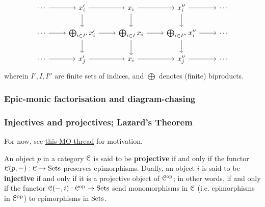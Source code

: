 \begin{example}
$$                            \begin{tikzcd}
                            	\cdots & {x'_i} & {x_i} & {x''_i} & \cdots \\
                            	{\cdots} & {\bigoplus_{i \in I'} x_i'} & {\bigoplus_{i \in I} x_i} & {\bigoplus_{i \in I''} x_i''} & {\cdots} \\
                            	\cdots & {x_j'} & {x_i} & {x_j''} & \cdots
                            	\arrow[from=2-1, to=2-2]
                            	\arrow[from=2-2, to=2-3]
                            	\arrow[from=2-3, to=2-4]
                            	\arrow[from=2-4, to=2-5]
                            	\arrow[from=1-2, to=2-2]
                            	\arrow[from=2-2, to=3-2]
                            	\arrow[from=1-3, to=2-3]
                            	\arrow[from=2-3, to=3-3]
                            	\arrow[from=1-4, to=2-4]
                            	\arrow[from=2-4, to=3-4]
                            	\arrow[from=1-2, to=1-3]
                            	\arrow[from=1-3, to=1-4]
                            	\arrow[from=3-2, to=3-3]
                            	\arrow[from=3-3, to=3-4]
                            	\arrow[from=1-1, to=1-2]
                            	\arrow[from=1-4, to=1-5]
                            	\arrow[from=3-1, to=3-2]
                            	\arrow[from=3-4, to=3-5]
                            \end{tikzcd}
                        $$
                    wherein $I', I, I''$ are finite sets of indices, and $\bigoplus$ denotes (finite) biproducts.
                \end{example}
        
        \subsubsection{Epic-monic factorisation and diagram-chasing}
        
        \subsubsection{Injectives and projectives; Lazard's Theorem}
            For now, see \href{https://mathoverflow.net/questions/46541/how-to-introduce-notions-of-flat-projective-and-free-modules}{\underline{this MO thread}} for motivation.
        
            \begin{definition} \label{def: projective_and_injective_objects}  
                An object $p$ in a category $\mathcal{C}$ is said to be \textbf{projective} if and only if the functor $\mathcal{C}(p, -): \mathcal{C} \to \mathrm{Sets}$ preserves epimorphisms. Dually, an object $i$ is said to be \textbf{injective} if and only if it is a projective object of $\mathcal{C}^{\mathrm{op}}$; in other words, if and only if the functor $\mathcal{C}(-, i): \mathcal{C}^{\mathrm{op}} \to \mathrm{Sets}$ send monomorphisms in $\mathcal{C}$ (i.e. epimorphisms in $\mathcal{C}^{\mathrm{op}}$) to epimorphisms in $\mathrm{Sets}$.
            \end{definition}
            
